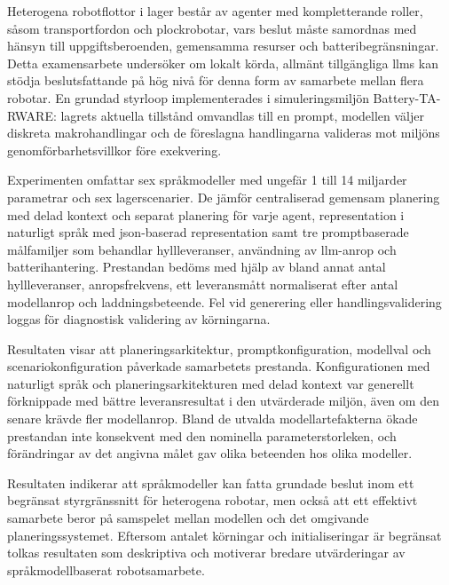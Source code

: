 Heterogena robotflottor i lager består av agenter med kompletterande roller, såsom transportfordon och plockrobotar, vars beslut måste samordnas med hänsyn till uppgiftsberoenden, gemensamma resurser och batteribegränsningar. Detta examensarbete undersöker om lokalt körda, allmänt tillgängliga \glspl{llm} kan stödja beslutsfattande på hög nivå för denna form av samarbete mellan flera robotar. En grundad styrloop implementerades i simuleringsmiljön Battery-TA-RWARE: lagrets aktuella tillstånd omvandlas till en prompt, modellen väljer diskreta makrohandlingar och de föreslagna handlingarna valideras mot miljöns genomförbarhetsvillkor före exekvering.

Experimenten omfattar sex språkmodeller med ungefär 1 till 14 miljarder parametrar och sex lagerscenarier. De jämför centraliserad gemensam planering med delad kontext och separat planering för varje agent, representation i naturligt språk med \gls{json}-baserad representation samt tre promptbaserade målfamiljer som behandlar hyllleveranser, användning av \gls{llm}-anrop och batterihantering. Prestandan bedöms med hjälp av bland annat antal hyllleveranser, anropsfrekvens, ett leveransmått normaliserat efter antal modellanrop och laddningsbeteende. Fel vid generering eller handlingsvalidering loggas för diagnostisk validering av körningarna.

Resultaten visar att planeringsarkitektur, promptkonfiguration, modellval och scenariokonfiguration påverkade samarbetets prestanda. Konfigurationen med naturligt språk och planeringsarkitekturen med delad kontext var generellt förknippade med bättre leveransresultat i den utvärderade miljön, även om den senare krävde fler modellanrop. Bland de utvalda modellartefakterna ökade prestandan inte konsekvent med den nominella parameterstorleken, och förändringar av det angivna målet gav olika beteenden hos olika modeller.

Resultaten indikerar att språkmodeller kan fatta grundade beslut inom ett begränsat styrgränssnitt för heterogena robotar, men också att ett effektivt samarbete beror på samspelet mellan modellen och det omgivande planeringssystemet. Eftersom antalet körningar och initialiseringar är begränsat tolkas resultaten som deskriptiva och motiverar bredare utvärderingar av språkmodellbaserat robotsamarbete.
